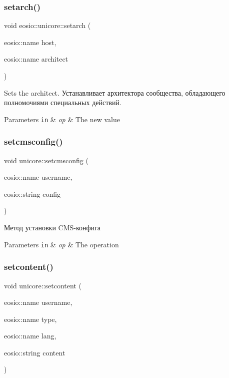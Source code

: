 \subsubsection{\texorpdfstring{setarch()}{setarch()}}
{\footnotesize\ttfamily void eosio\+::unicore\+::setarch (\begin{DoxyParamCaption}\item[{eosio\+::name}]{host,  }\item[{eosio\+::name}]{architect }\end{DoxyParamCaption})}



Sets the architect. Устанавливает архитектора сообщества, обладающего полномочиями специальных действий. 


\begin{DoxyParams}[1]{Parameters}
\mbox{\tt in}  & {\em op} & The new value \\
\hline
\end{DoxyParams}
\mbox{\label{classeosio_1_1unicore_ad0188feae42e22b52afbb6e3c3f70c86}} 
\subsubsection{\texorpdfstring{setcmsconfig()}{setcmsconfig()}}
{\footnotesize\ttfamily void unicore\+::setcmsconfig (\begin{DoxyParamCaption}\item[{eosio\+::name}]{username,  }\item[{eosio\+::string}]{config }\end{DoxyParamCaption})}



Метод установки C\+M\+S-\/конфига 


\begin{DoxyParams}[1]{Parameters}
\mbox{\tt in}  & {\em op} & The operation \\
\hline
\end{DoxyParams}
\mbox{\label{classeosio_1_1unicore_abab6ddd4a167efde5f0e45a1ffd9dfba}} 
\subsubsection{\texorpdfstring{setcontent()}{setcontent()}}
{\footnotesize\ttfamily void unicore\+::setcontent (\begin{DoxyParamCaption}\item[{eosio\+::name}]{username,  }\item[{eosio\+::name}]{type,  }\item[{eosio\+::name}]{lang,  }\item[{eosio\+::string}]{content }\end{DoxyParamCaption})}



